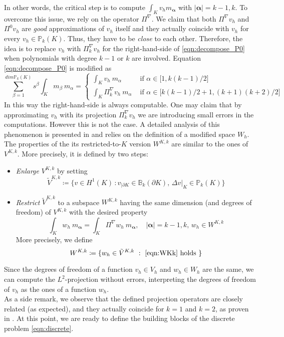 \documentclass[10pt]{article}
\begin{document}
In other words, the critical step is to compute $\int_{K} v_h m_\mathbf{\alpha}$ with $|\mathbf{\alpha}|=k-1,k$. To overcome this issue, we rely on the operator $\Pi^\nabla$. We claim that both $\Pi^\nabla v_h$ and $\Pi^0 v_h$ are \textit{good} approximations of $v_h$ itself and they actually coincide with $v_h$ for every $v_h \in \mathbb{P}_k(K)$. Thus, they have to be \textit{close} to each other. Therefore, the idea is to replace $v_h$ with $\Pi_k^\nabla v_h$ for the right-hand-side of \eqref{eqn:decompose_P0} when polynomials with degree $k-1$ or $k$ are involved. Equation \eqref{eqn:decompose_P0} is modified as
\begin{equation}
\sum_{\beta=1}^{dim \mathbb{P}_k(K)} s^\beta \int_{K} m_\beta \ m_\alpha = 
	\begin{cases}
		\int_K v_h \ m_\alpha &\mbox{ if $\alpha \in \lbrack 1, k(k-1)/2 \rbrack$} \\
		\int_K \Pi_k^\nabla v_h \ m_\alpha &\mbox{ if $\alpha \in \lbrack k(k-1)/2+1, (k+1)(k+2)/2 \rbrack$}
	\end{cases}
\label{eqn:decompose_P0mod}
\end{equation}
In this way the right-hand-side is always computable. One may claim that by approximating $v_h$ with its projection $\Pi_k^\nabla v_h$ we are introducing small errors in the computations. However this is not the case. A detailed analysis of this phenomenon is presented in \cite{Equivalent_proj} and relies on the definition of a modified space $W_h$. The properties of the its restricted-to-$K$ version $W^{K,k}$ are similar to the ones of $V^{K,k}$. More precisely, it is defined by two steps:
\begin{itemize}
	\item \textit{Enlarge} $V^{K,k}$ by setting
	$$\tilde{V}^{K,k}
	\coloneqq \lbrace v \in H^1(K) \, : v_{|\partial K} \in \mathbb{B}_k(\partial K), \, \Delta v |_K \in \mathbb{P}_{k}(K) \rbrace $$
	\item \textit{Restrict} $\tilde{V}^{K,k}$ to a subspace $W^{K,k}$ having the same dimension (and degrees of freedom) of $V^{K,k}$ with the desired property
	\begin{equation}
	\int_K w_h \ m_\mathbf{\alpha} = \int_K \Pi^\nabla w_h \ m_\mathbf{\alpha}, \quad |\mathbf{\alpha}|=k-1,k, \, w_h \in W^{K,k}
	\label{eqn:WKk}
	\end{equation}
	More precisely, we define
	$$W^{K,k} \coloneqq \lbrace w_h \in \tilde{V}^{K,k} \ : \ \text{\eqref{eqn:WKk} holds } \rbrace $$
\end{itemize}
Since the degrees of freedom of a function $v_h \in V_h$ and $w_h \in W_h$ are the same, we can compute the $L^2$-projection without errors, interpreting the degrees of freedom of $v_h$ as the ones of a function $w_h$. \\
As a side remark, we observe that the defined projection operators are closely related (as expected), and they actually coincide for $k=1$ and $k=2$, as proven in \cite{hitchhiker}.
At this point, we are ready to define the building blocks of the discrete problem \eqref{eqn:discrete}.
\end{document}
